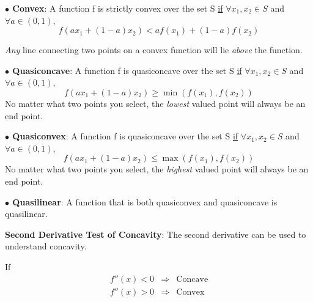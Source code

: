 \documentclass[]{book}
\theoremstyle{definition}
\theoremstyle{definition}
\theoremstyle{definition}
\theoremstyle{remark}
\begin{document}

\parbox[c]{5in}{{\bf $\bullet$ Convex}: A function f is strictly convex over the set S \underline{if} $\forall x_1,x_2 \in S$ and $\forall a \in (0,1)$, $$f(ax_1 + (1-a)x_2) < af(x_1) + (1-a)f(x_2)$$

\textit{Any} line connecting two points on a convex function will lie \textit{above} the function.}

\parbox[c]{5in}{{\bf $\bullet$ Quasiconcave}: A function f is quasiconcave over the set S \underline{if} $\forall x_1,x_2 \in S$ and $\forall a \in (0,1)$, $$f(ax_1 + (1-a)x_2) \ge \min(f(x_1),f(x_2))$$
No matter what two points you select, the \textit{lowest} valued point will always be an end point.}

\parbox[c]{5in}{{\bf $\bullet$ Quasiconvex}: A function f is quasiconcave over the set S \underline{if} $\forall x_1,x_2 \in S$ and $\forall a \in (0,1)$, $$f(ax_1 + (1-a)x_2) \le \max(f(x_1),f(x_2))$$
No matter what two points you select, the \textit{highest} valued point will always be an end point.}

\parbox[c]{5in}{{\bf $\bullet$ Quasilinear}: A function that is both quasiconvex and quasiconcave is quasilinear.}

\textbf{Second Derivative Test of Concavity}: The second derivative can
be used to understand concavity.

If \[\begin{array}{lll}
f''(x) < 0 & \Rightarrow & \text{Concave}\\
f''(x) > 0 & \Rightarrow & \text{Convex}
\end{array}\]
\end{document}
